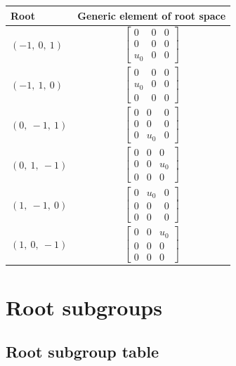 \documentclass[11pt]{article}
\theoremstyle{definition}
\begin{document}
\noindent \begin{longtable}{|l|c|}
    \hline
    \textbf{Root} & \textbf{Generic element of root space} \\
    \hline
    \endhead
    $\left( -1, \  0, \  1\right)$ & ${\left[\begin{matrix}0 & 0 & 0\\0 & 0 & 0\\u_{0} & 0 & 0\end{matrix}\right]}$ \\
    \hline
    $\left( -1, \  1, \  0\right)$ & ${\left[\begin{matrix}0 & 0 & 0\\u_{0} & 0 & 0\\0 & 0 & 0\end{matrix}\right]}$ \\
    \hline
    $\left( 0, \  -1, \  1\right)$ & ${\left[\begin{matrix}0 & 0 & 0\\0 & 0 & 0\\0 & u_{0} & 0\end{matrix}\right]}$ \\
    \hline
    $\left( 0, \  1, \  -1\right)$ & ${\left[\begin{matrix}0 & 0 & 0\\0 & 0 & u_{0}\\0 & 0 & 0\end{matrix}\right]}$ \\
    \hline
    $\left( 1, \  -1, \  0\right)$ & ${\left[\begin{matrix}0 & u_{0} & 0\\0 & 0 & 0\\0 & 0 & 0\end{matrix}\right]}$ \\
    \hline
    $\left( 1, \  0, \  -1\right)$ & ${\left[\begin{matrix}0 & 0 & u_{0}\\0 & 0 & 0\\0 & 0 & 0\end{matrix}\right]}$ \\
    \hline
\end{longtable}


\newpage
\section{Root subgroups}

\subsection{Root subgroup table}
\end{document}
